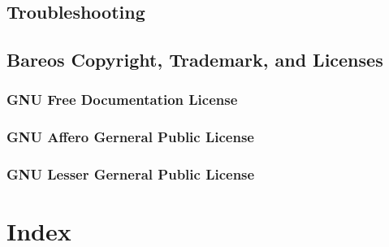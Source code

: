 \documentclass[10pt,a4paper]{book}
\begin{document}






\chapter{Troubleshooting}


\chapter{Bareos Copyright, Trademark, and Licenses}
\label{LicenseChapter}

    

\pagebreak
\section{GNU Free Documentation License}
    \label{fdl}
    

\pagebreak
\section{GNU Affero Gerneral Public License}
    \label{agpl}
    

\pagebreak
\section{GNU Lesser Gerneral Public License}
    \label{lgpl}
    

\part{Index}
\printindex[general]
\printindex[dir]
\printindex[sd]
\printindex[fd]
\printindex[console]
\printindex[monitor]
\end{document}
